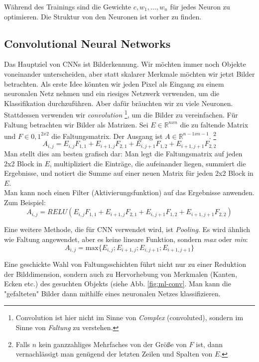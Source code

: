 Während des Trainings sind die Gewichte $c, w_1,...,w_n$ für jedes Neuron zu optimieren. Die Struktur von den Neuronen ist vorher zu finden.

\subsection{Convolutional Neural Networks}
Das Hauptziel von CNNs ist Bilderkennung. Wir möchten immer noch Objekte voneinander unterscheiden, aber statt skalarer Merkmale möchten wir jetzt Bilder betrachten. Als erste Idee könnten wir jeden Pixel als Eingang zu einem neuronalen Netz nehmen und ein riesiges Netzwerk verwenden, um die Klassifikation durchzuführen. Aber dafür bräuchten wir zu viele Neuronen. Stattdessen verwenden wir \textit{convolution} \footnote{Convolution ist hier nicht im Sinne von \textit{Complex} (convoluted), sondern im Sinne von \textit{Faltung} zu verstehen. }, um die Bilder zu vereinfachen. Für Faltung betrachten wir Bilder als Matrizen. Sei $E \in \mathbb{R}^{nxn}$ die zu faltende Matrix und $F \in {0,1}^{2x2}$ die Faltungsmatrix. Der Ausgang ist $A \in \mathbb{R}^{n-1xn-1}$. \footnote{Falls $n$ kein ganzzahliges Mehrfaches von der Größe von $F$ ist, dann vernachlässigt man genügend der letzten Zeilen und Spalten von $E$.}
\begin{equation}
    A_{i,j} = E_{i,j}F_{1,1} + E_{i+1,j}F_{2,1} + E_{i,j+1}F_{1,2} +E_{i+1,j+1}F_{2,2}     
\end{equation}
Man stellt dies am besten grafisch dar: Man legt die Faltungsmatrix auf jeden 2x2 Block in $E$, multipliziert die Einträge, die aufeinander liegen, summiert die Ergebnisse, und notiert die Summe auf einer neuen Matrix für jeden 2x2 Block in $E$. \\

Man kann noch einen Filter (Aktivierungsfunktion) auf das Ergebnisse anwenden. Zum Beispiel:
\begin{equation}
        A_{i,j} = RELU( E_{i,j}F_{1,1} + E_{i+1,j}F_{2,1} + E_{i,j+1}F_{1,2} +E_{i+1,j+1}F_{2,2} )
\end{equation}

Eine weitere Methode, die für CNN verwendet wird, ist \textit{Pooling}. Es wird ähnlich wie Faltung angewendet, aber es keine lineare Funktion, sondern \textit{max} oder \textit{min}:
\begin{equation}
    A_{i,j} = \mathrm{max}\{E_{i,j};E_{i+1,j};E_{i,j+1};E_{i+1,j+1}\}
\end{equation}

Eine geschickte Wahl von Faltungsschichten führt nicht nur zu einer Reduktion der Bilddimension, sondern auch zu Hervorhebung von Merkmalen (Kanten, Ecken etc.) des gesuchten Objekts (siehe Abb. \ref{fig:ml-conv}. Man kann die "gefalteten" Bilder dann mithilfe eines neuronalen Netzes klassifizieren.

